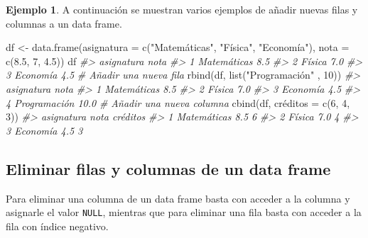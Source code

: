 \documentclass[
]{book}
\newenvironment{Shaded}{\begin{snugshade}}{\end{snugshade}}
\newcommand{\AttributeTok}[1]{\textcolor[rgb]{0.77,0.63,0.00}{#1}}
\newcommand{\CommentTok}[1]{\textcolor[rgb]{0.56,0.35,0.01}{\textit{#1}}}
\newcommand{\DecValTok}[1]{\textcolor[rgb]{0.00,0.00,0.81}{#1}}
\newcommand{\FloatTok}[1]{\textcolor[rgb]{0.00,0.00,0.81}{#1}}
\newcommand{\FunctionTok}[1]{\textcolor[rgb]{0.00,0.00,0.00}{#1}}
\newcommand{\NormalTok}[1]{#1}
\newcommand{\OtherTok}[1]{\textcolor[rgb]{0.56,0.35,0.01}{#1}}
\newcommand{\StringTok}[1]{\textcolor[rgb]{0.31,0.60,0.02}{#1}}
\theoremstyle{definition}
\theoremstyle{definition}
\newtheorem{example}{Ejemplo}[chapter]
\theoremstyle{definition}
\theoremstyle{definition}
\theoremstyle{remark}
\begin{document}
\begin{example}

A continuación se muestran varios ejemplos de añadir nuevas filas y columnas a un data frame.

\begin{Shaded}
\begin{Highlighting}[]
\NormalTok{df }\OtherTok{\textless{}{-}} \FunctionTok{data.frame}\NormalTok{(}\AttributeTok{asignatura =} \FunctionTok{c}\NormalTok{(}\StringTok{"Matemáticas"}\NormalTok{, }\StringTok{"Física"}\NormalTok{, }\StringTok{"Economía"}\NormalTok{), }\AttributeTok{nota =} \FunctionTok{c}\NormalTok{(}\FloatTok{8.5}\NormalTok{, }\DecValTok{7}\NormalTok{, }\FloatTok{4.5}\NormalTok{))}
\NormalTok{df}
\CommentTok{\#\textgreater{}    asignatura nota}
\CommentTok{\#\textgreater{} 1 Matemáticas  8.5}
\CommentTok{\#\textgreater{} 2      Física  7.0}
\CommentTok{\#\textgreater{} 3    Economía  4.5}
\CommentTok{\# Añadir una nueva fila}
\FunctionTok{rbind}\NormalTok{(df, }\FunctionTok{list}\NormalTok{(}\StringTok{"Programación"}\NormalTok{ , }\DecValTok{10}\NormalTok{))}
\CommentTok{\#\textgreater{}     asignatura nota}
\CommentTok{\#\textgreater{} 1  Matemáticas  8.5}
\CommentTok{\#\textgreater{} 2       Física  7.0}
\CommentTok{\#\textgreater{} 3     Economía  4.5}
\CommentTok{\#\textgreater{} 4 Programación 10.0}
\CommentTok{\# Añadir una nueva columna}
\FunctionTok{cbind}\NormalTok{(df, créditos }\OtherTok{=} \FunctionTok{c}\NormalTok{(}\DecValTok{6}\NormalTok{, }\DecValTok{4}\NormalTok{, }\DecValTok{3}\NormalTok{))}
\CommentTok{\#\textgreater{}    asignatura nota créditos}
\CommentTok{\#\textgreater{} 1 Matemáticas  8.5        6}
\CommentTok{\#\textgreater{} 2      Física  7.0        4}
\CommentTok{\#\textgreater{} 3    Economía  4.5        3}
\end{Highlighting}
\end{Shaded}

\end{example}

\hypertarget{eliminar-filas-y-columnas-de-un-data-frame}{%
\subsection{Eliminar filas y columnas de un data frame}\label{eliminar-filas-y-columnas-de-un-data-frame}}

Para eliminar una columna de un data frame basta con acceder a la columna y asignarle el valor \texttt{NULL}, mientras que para eliminar una fila basta con acceder a la fila con índice negativo.
\end{document}
